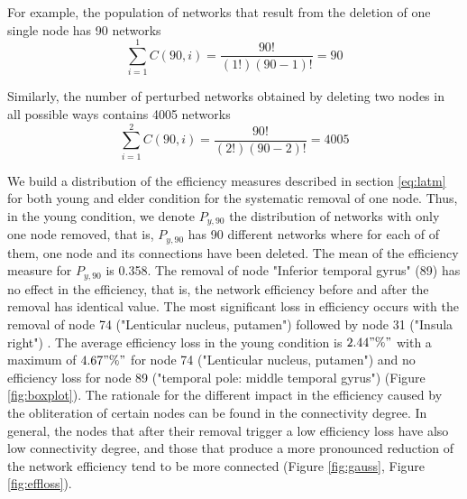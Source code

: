 \documentclass[12pt,a4paper]{article}
\begin{document}
For example, the population of networks that result from the deletion of one single node has 90 networks 
\begin{equation*}
\sum_{i=1}^{1}
C(90,i) = \frac{90!} {(1!)(90-1)!} = 90
\end{equation*}

Similarly, the number of perturbed networks obtained by deleting two nodes in all possible ways contains 4005 networks
\begin{equation*}
\sum_{i=1}^{2} C(90,i)=
 \frac{90!} {(2!)(90-2)!} = 4005
\end{equation*}

We build a distribution of the efficiency measures described in section \ref{eq:latm}
for both young and elder condition for the systematic removal of one node. Thus, in the young condition, we denote $P_{y, 90}$ the distribution of networks with only one node removed, that is, $P_{y, 90}$ has 90 different networks where for each of of them, one node and its connections have been deleted. 
The mean of the efficiency measure for $P_{y, 90}$ is 0.358. The removal of node  "Inferior temporal gyrus" (89) has no effect in the efficiency, that is, the network efficiency before and after the removal has identical value. 
The most significant loss in efficiency occurs with the removal of node 74 ("Lenticular nucleus, putamen") followed by node 31 ("Insula right") . 
The average efficiency loss in the young condition is $2.44"\%" $ with a maximum of  $4.67"\%" $ for node 74 ("Lenticular nucleus, putamen") and no efficiency loss for node 89 ("temporal pole: middle temporal gyrus") (Figure \ref{fig:boxplot}). The rationale for the different impact in the efficiency caused by the obliteration of certain nodes can be found in the connectivity degree. In general, the nodes that after their removal trigger a low efficiency loss have also low connectivity degree, and those that produce a more pronounced reduction of the network efficiency tend to be more connected (Figure \ref{fig:gauss}, Figure \ref{fig:effloss}). 
\end{document}
